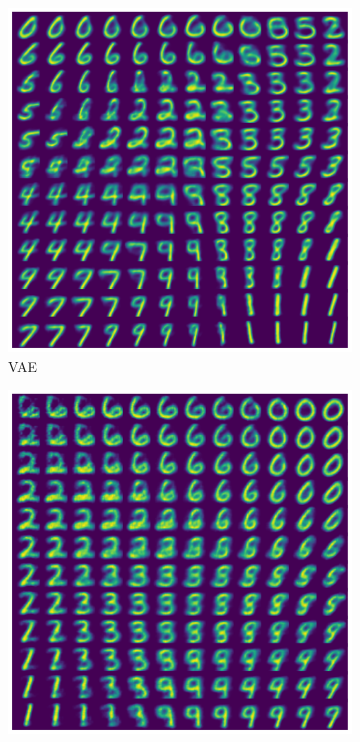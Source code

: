 \begin{figure}%
	\begin{subfigure}[t]{0.49\textwidth}
		\centering
		\includegraphics[width = 1\textwidth]{figures/vae/interpolation}
		\caption{VAE}
	\end{subfigure}
	\begin{subfigure}[t]{0.49\textwidth}
		\centering
		\includegraphics[width = 1\textwidth]{figures/cvae/interpolation}

\end{subfigure}
\end{figure}
